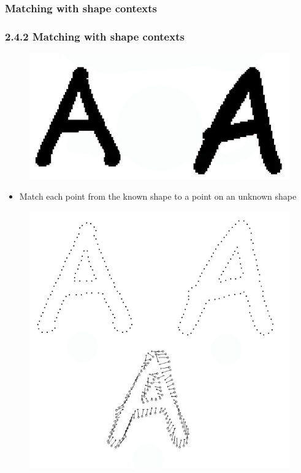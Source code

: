 \documentclass[notheorems,serif,table,compress]{beamer}  %
\begin{document}
\subsubsection{Matching with shape contexts}
\begin{frame}
\frametitle{2.4.2 Matching with shape contexts}
            \begin{figure}
              \centering
              \includegraphics[width=0.35\linewidth]{context1}
            \end{figure}
    \begin{itemize}
        \item Match each point from the known shape to a point on an unknown shape
    \end{itemize}
        \begin{figure}
        \includegraphics[width=0.35\linewidth]{pointmatch} 
        \end{figure}
\end{frame}
\end{document}
